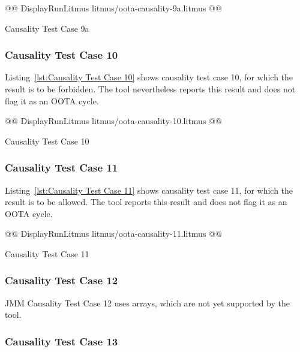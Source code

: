 \documentclass[10]{article}
\begin{document}
\begin{listing}[tbp]
@@ DisplayRunLitmus litmus/oota-causality-9a.litmus @@
\caption{Causality Test Case 9a}
\label{lst:Causality Test Case 9a}
\end{listing}

\subsubsection{Causality Test Case 10}
\label{app:Causality Test Case 10}

Listing~\ref{lst:Causality Test Case 10}
shows causality test case 10, for which the 
result is to be forbidden.
The  tool nevertheless reports this result and does not flag it as
an OOTA cycle.

\begin{listing}[tbp]
@@ DisplayRunLitmus litmus/oota-causality-10.litmus @@
\caption{Causality Test Case 10}
\label{lst:Causality Test Case 10}
\end{listing}

\subsubsection{Causality Test Case 11}
\label{app:Causality Test Case 11}

Listing~\ref{lst:Causality Test Case 11}
shows causality test case 11, for which the 
result is to be allowed.
The  tool reports this result and does not flag it as an OOTA cycle.

\begin{listing}[tbp]
@@ DisplayRunLitmus litmus/oota-causality-11.litmus @@
\caption{Causality Test Case 11}
\label{lst:Causality Test Case 11}
\end{listing}

\subsubsection{Causality Test Case 12}
\label{app:Causality Test Case 12}

JMM Causality Test Case 12 uses arrays, which are not yet supported
by the  tool.

\subsubsection{Causality Test Case 13}
\label{app:Causality Test Case 13}
\end{document}
